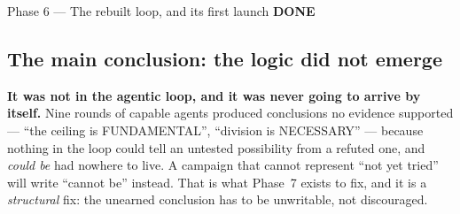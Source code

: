 \documentclass[11pt,a4paper]{article}
\newcommand{\done}{\textcolor{good}{\textbf{DONE}}}
\begin{document}
\begin{phasebox}{Phase 6 --- The rebuilt loop, and its first launch \hfill \done}
\subsection*{The main conclusion: the logic did not emerge}
\textbf{It was not in the agentic loop, and it was never going to arrive by itself.} Nine rounds of
capable agents produced conclusions no evidence supported --- ``the ceiling is FUNDAMENTAL'',
``division is NECESSARY'' --- because nothing in the loop could tell an untested possibility from a
refuted one, and \emph{could be} had nowhere to live. A campaign that cannot represent ``not yet
tried'' will write ``cannot be'' instead. That is what Phase~7 exists to fix, and it is a
\emph{structural} fix: the unearned conclusion has to be unwritable, not discouraged.
\end{phasebox}
\end{document}
